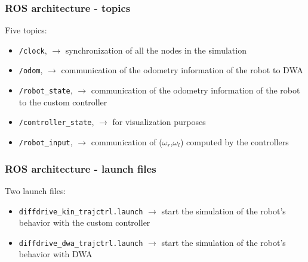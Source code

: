 \documentclass{beamer}
\begin{document}

\begin{frame}
\frametitle{ROS architecture - topics}

Five topics:
\begin{itemize}
  \item \texttt{/clock}, $\rightarrow$ synchronization of all the nodes in the simulation
  \item \texttt{/odom}, $\rightarrow$ communication of the odometry information of the robot to DWA
  \item \texttt{/robot\_state}, $\rightarrow$ communication of the odometry information of the robot to the custom controller
  \item \texttt{/controller\_state}, $\rightarrow$ for visualization purposes
  \item \texttt{/robot\_input}, $\rightarrow$ communication of ($\omega_r$,$\omega_l$) computed by the controllers
\end{itemize}

\end{frame}


\begin{frame}
\frametitle{ROS architecture - launch files}

Two launch files:
\begin{itemize}
  \item \texttt{diffdrive\_kin\_trajctrl.launch} $\rightarrow$ start the simulation of the robot's behavior with the custom controller
  \item \texttt{diffdrive\_dwa\_trajctrl.launch} $\rightarrow$ start the simulation of the robot's behavior with DWA
\end{itemize}


\end{frame}

\end{document}
